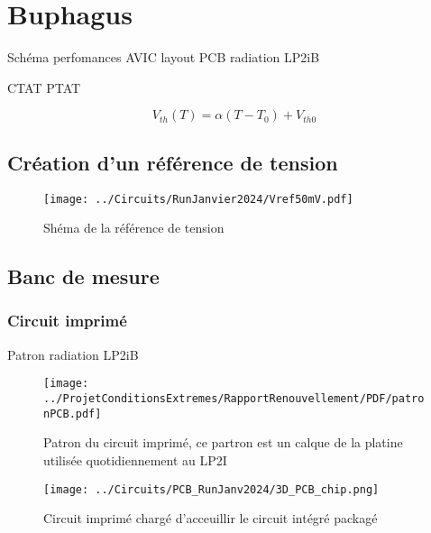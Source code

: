 \section{Buphagus}
\begin{metsUneSource}
Schéma
perfomances
AVIC
layout
PCB
radiation LP2iB

CTAT PTAT


\begin{equation}
    V_{th}(T) = \alpha(T - T_0) + V_{th0}
    \label{VtEnFonctionDeT}
\end{equation}


\end{metsUneSource}

\subsection{Création d'un référence de tension}


\begin{figure}
    \centering
    \texttt{[image: ../Circuits/RunJanvier2024/Vref50mV.pdf]}
    \caption{Shéma de la référence de tension}
    \label{fig:schBuphagus}
\end{figure}




\subsection{Banc de mesure}



\subsubsection{Circuit imprimé}

Patron radiation LP2iB
\begin{figure}
    \centering
    \texttt{[image: ../ProjetConditionsExtremes/RapportRenouvellement/PDF/patronPCB.pdf]}
    \caption{Patron du circuit imprimé, ce partron est un calque de la platine utilisée quotidiennement au LP2I}
    \label{fig:patron_PCB_Buphagus}
\end{figure}

\begin{figure}
    \centering
    \texttt{[image: ../Circuits/PCB\_RunJanv2024/3D\_PCB\_chip.png]}
    \caption{Circuit imprimé chargé d'acceuillir le circuit intégré packagé}
    \label{fig:PCB_Buphagus}
\end{figure}

